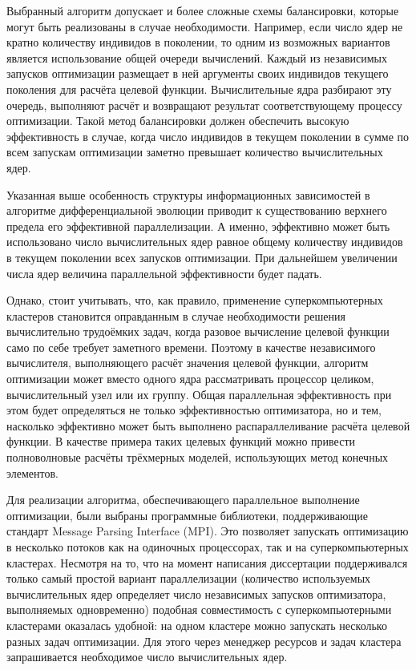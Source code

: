 Выбранный алгоритм допускает и более сложные схемы балансировки,
которые могут быть реализованы в случае необходимости. Например, если
число ядер не кратно количеству индивидов в поколении, то одним из
возможных вариантов является использование общей очереди
вычислений. Каждый из независимых запусков оптимизации размещает в ней
аргументы своих индивидов текущего поколения для расчёта целевой
функции.  Вычислительные ядра разбирают эту очередь, выполняют расчёт
и возвращают результат соответствующему процессу оптимизации. Такой
метод балансировки должен обеспечить высокую эффективность в случае,
когда число индивидов в текущем поколении в сумме по всем запускам
оптимизации заметно превышает количество вычислительных ядер.

Указанная выше особенность структуры информационных зависимостей в
алгоритме дифференциальной эволюции приводит к существованию верхнего
предела его эффективной параллелизации.  А именно, эффективно может
быть использовано число вычислительных ядер равное общему количеству
индивидов в текущем поколении всех запусков оптимизации. При
дальнейшем увеличении числа ядер величина параллельной эффективности
будет падать.

Однако, стоит учитывать, что, как правило, применение
суперкомпьютерных кластеров становится оправданным в случае
необходимости решения вычислительно трудоёмких задач, когда разовое
вычисление целевой функции само по себе требует заметного
времени. Поэтому в качестве независимого вычислителя, выполняющего
расчёт значения целевой функции, алгоритм оптимизации может вместо
одного ядра  рассматривать процессор целиком, вычислительный
узел или их группу. Общая параллельная эффективность при этом
будет определяться не только эффективностью оптимизатора, но и тем,
насколько эффективно может быть выполнено распараллеливание расчёта
целевой функции.  В качестве примера таких целевых функций можно
привести полноволновые расчёты трёхмерных моделей, использующих метод
конечных элементов.

Для реализации алгоритма, обеспечивающего параллельное выполнение
оптимизации, были выбраны программные библиотеки, поддерживающие
стандарт Message Parsing Interface (MPI). Это позволяет запускать
оптимизацию в несколько потоков как на одиночных процессорах, так и на
суперкомпьютерных кластерах. Несмотря на то, что на момент написания
диссертации поддерживался только самый простой вариант параллелизации
(количество используемых вычислительных ядер определяет число
независимых запусков оптимизатора, выполняемых одновременно) подобная
совместимость с суперкомпьютерными кластерами оказалась удобной: на
одном кластере можно запускать несколько разных задач оптимизации. 
Для этого через менеджер ресурсов и
задач кластера запрашивается необходимое число вычислительных ядер.

